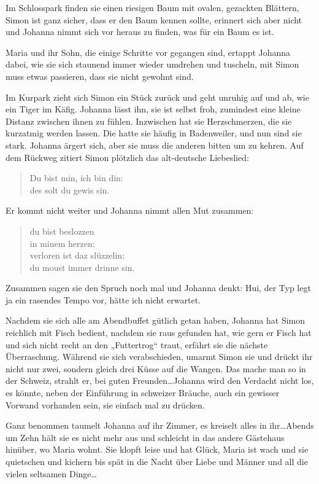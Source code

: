 \documentclass[10pt,titlepage,a5paper]{book}
\begin{document}
Im Schlosspark finden sie einen riesigen Baum mit ovalen, gezackten Blättern, Simon ist ganz sicher, dass er den Baum kennen sollte, erinnert sich aber nicht und Johanna nimmt sich vor heraus zu finden, was für ein Baum es ist.

Maria und ihr Sohn, die einige Schritte vor gegangen sind, ertappt Johanna dabei, wie sie sich staunend immer wieder umdrehen und tuscheln, mit Simon muss etwas passieren, dass sie nicht gewohnt sind.

Im Kurpark zieht sich Simon ein Stück zurück und geht unruhig auf und ab, wie ein Tiger im Käfig. Johanna lässt ihn, sie ist selbst froh, zumindest eine kleine Distanz zwischen ihnen zu fühlen. Inzwischen hat sie Herzschmerzen, die sie kurzatmig werden lassen. Die hatte sie häufig in Badenweiler, und nun sind sie stark. Johanna ärgert sich, aber sie muss die anderen bitten um zu kehren. Auf dem Rückweg zitiert Simon plötzlich das alt-deutsche Liebeslied:


\begin{verse}
Du bist min, ich bin din:\\
des solt du gewis sin.
\end{verse}
Er kommt nicht weiter und Johanna nimmt allen Mut zusammen:

\begin{verse}
du bist beslozzen\\
in minem herzen:\\
verloren ist daz slüzzelin:\\
du moust immer drinne sin.
\end{verse}

Zusammen sagen sie den Spruch noch mal und Johanna denkt: Hui, der Typ legt ja ein rasendes Tempo vor, hätte ich nicht erwartet.

Nachdem sie sich alle am Abendbuffet gütlich getan haben, Johanna hat Simon reichlich mit Fisch bedient, nachdem sie raus gefunden hat, wie gern er Fisch hat und sich nicht recht an den „Futtertrog“ traut, erfährt sie die nächste Überraschung. Während sie sich verabschieden, umarmt Simon sie und drückt ihr nicht nur zwei, sondern gleich drei Küsse auf die Wangen. Das mache man so in der Schweiz, strahlt er, bei guten Freunden\dots  Johanna wird den Verdacht nicht los, es könnte, neben der Einführung in schweizer Bräuche, auch ein gewisser Vorwand vorhanden sein, sie einfach mal zu drücken. 

Ganz benommen taumelt Johanna auf ihr Zimmer, es kreiselt alles in ihr\dots  Abends um Zehn hält sie es nicht mehr aus und schleicht in das andere Gästehaus hinüber, wo Maria wohnt. Sie klopft leise und hat Glück, Maria ist wach und sie quietschen und kichern bis spät in die Nacht über Liebe und Männer und all die vielen seltsamen Dinge\dots 
\end{document}
